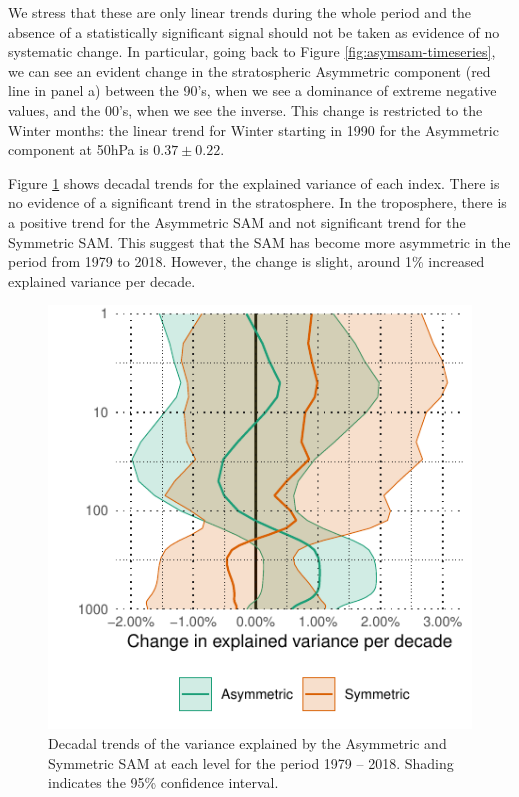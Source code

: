 \documentclass[smallextended]{svjour3}       %
\begin{document}
We stress that these are only linear trends during the whole period and the absence of a statistically significant signal should not be taken as evidence of no systematic change. In particular, going back to Figure \ref{fig:asymsam-timeseries}, we can see an evident change in the stratospheric Asymmetric component (red line in panel a) between the 90's, when we see a dominance of extreme negative values, and the 00's, when we see the inverse. This change is restricted to the Winter months: the linear trend for Winter starting in 1990 for the Asymmetric component at 50hPa is \(0.37 \pm 0.22\).

Figure \ref{fig:r-squared-trend} shows decadal trends for the explained variance of each index. There is no evidence of a significant trend in the stratosphere. In the troposphere, there is a positive trend for the Asymmetric SAM and not significant trend for the Symmetric SAM. This suggest that the SAM has become more asymmetric in the period from 1979 to 2018. However, the change is slight, around 1\% increased explained variance per decade.

\begin{figure}
\includegraphics{r-squared-trend-1} \caption{Decadal trends of the variance explained by the Asymmetric and Symmetric SAM at each level for the period 1979 -- 2018. Shading indicates the 95\% confidence interval.}\label{fig:r-squared-trend}
\end{figure}
\end{document}
